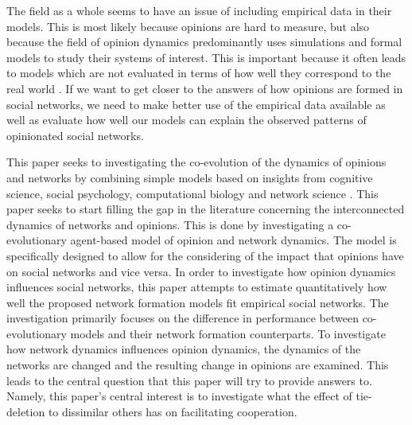 \documentclass{article}
\begin{document}
The field as a whole seems to have an issue of including empirical data in their models. 
This is most likely because opinions are hard to measure, but also because the field of opinion dynamics predominantly uses simulations and formal models to study their systems of interest. This is important because it often leads to models which are not evaluated in terms of how well they correspond to the real world \cite{flache_models_2017,galesic_integrating_2021}. If we want to get closer to the answers of how opinions are formed in social networks, we need to make better use of the empirical data available as well as evaluate how well our models can explain the observed patterns of opinionated social networks. 

This paper seeks to investigating the co-evolution of the dynamics of opinions and networks by combining simple models based on insights from cognitive science, social psychology, computational biology and network science \cite{asikainen_cumulative_2020,flache_models_2017,ilany_social_2016,jackson_meeting_2007,santos_cooperation_2006}. This paper seeks to start filling the gap in the literature concerning the interconnected dynamics of networks and opinions. This is done by investigating a co-evolutionary agent-based model of opinion and network dynamics. The model is specifically designed to allow for the considering of the impact that opinions have on social networks and vice versa. In order to investigate how opinion dynamics influences social networks, this paper attempts to estimate quantitatively how well the proposed network formation models fit empirical social networks. The investigation primarily focuses on the difference in performance between co-evolutionary models and their network formation counterparts. To investigate how network dynamics influences opinion dynamics, the dynamics of the networks are changed and the resulting change in opinions are examined. This leads to the central question that this paper will try to provide answers to. Namely, this paper’s central interest is to investigate what the effect of tie-deletion to dissimilar others has on facilitating cooperation. 
\end{document}
